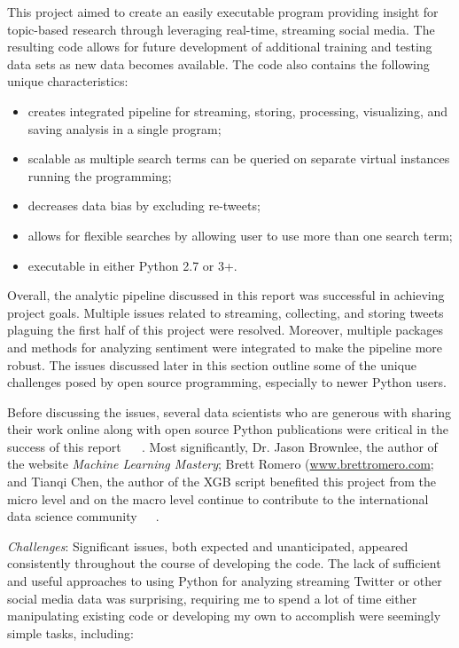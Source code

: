 This project aimed to create an easily executable program providing
insight for topic-based research through leveraging real-time,
streaming social media.  The resulting code allows for future
development of additional training and testing data sets as new data
becomes available.  The code also contains the following unique
characteristics:

\begin{itemize}
\item creates integrated pipeline for streaming,
storing, processing, visualizing, and saving
analysis in a single program; 
\item scalable as multiple search terms can be queried on separate virtual 
instances running the programming; 
\item decreases data bias by excluding re-tweets;
\item allows for flexible searches by allowing
user to use more than one search term;
\item executable in either Python 2.7 or 3+.
\end{itemize}

Overall, the analytic pipeline discussed in this report was successful
in achieving project goals.  Multiple issues related to streaming,
collecting, and storing tweets plaguing the first half of this project
were resolved.  Moreover, multiple packages and methods for analyzing
sentiment were integrated to make the pipeline more robust.  The
issues discussed later in this section outline some of the unique
challenges posed by open source programming, especially to newer
Python users.

Before discussing the issues, several data scientists who are generous
with sharing their work online along with open source Python
publications were critical in the success of this report
~\cite{sweigart2015} ~\cite{ojeda2014}.  Most significantly, Dr. Jason
Brownlee, the author of the website \emph{Machine Learning Mastery};
Brett Romero (\url{www.brettromero.com}; and Tianqi Chen, the author
of the XGB script benefited this project from the micro level and on
the macro level continue to contribute to the international data
science
community~\cite{brownlee_2016}~\cite{romero2016}~\cite{Chen2016}.

\emph{Challenges}: Significant issues, both expected and
unanticipated, appeared consistently throughout the course of
developing the code.  The lack of sufficient and useful approaches to
using Python for analyzing streaming Twitter or other social media
data was surprising, requiring me to spend a lot of time either
manipulating existing code or developing my own to accomplish were
seemingly simple tasks, including:

